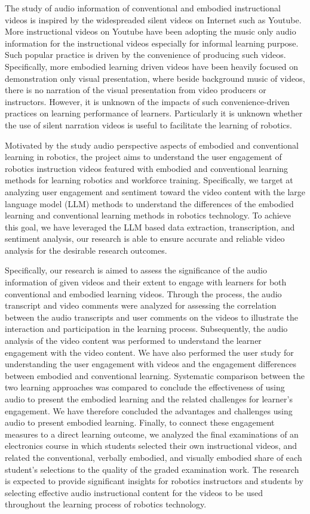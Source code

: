 \documentclass[fleqn,10pt]{JLA_article} %
\begin{document}
The study of audio information of conventional and embodied instructional videos is inspired by the widespreaded silent videos on Internet such as Youtube. More instructional videos on Youtube have been adopting the music only audio information for the instructional videos especially for informal learning purpose. Such popular practice is driven by the convenience of producing such videos. Specifically, more embodied learning driven videos have been heavily focused on demonstration only visual presentation, where beside background music of videos, there is no narration of the visual presentation from video producers or instructors. However, it is unknown of the impacts of such convenience-driven practices on learning performance of learners. Particularly it is unknown whether the use of silent narration videos is useful to facilitate the learning of robotics.

Motivated by the study audio perspective aspects of embodied and conventional learning in robotics, the project aims to understand the user engagement of robotics instruction videos featured with embodied and conventional learning methods for learning robotics and workforce training. Specifically, we target at analyzing user engagement and sentiment toward the video content with the large language model (LLM) methods to understand the differences of the embodied learning and conventional learning methods in robotics technology. To achieve this goal, we have leveraged the LLM based data extraction, transcription, and sentiment analysis, our research is able to ensure accurate and reliable video analysis for the desirable research outcomes.

Specifically, our research is aimed to assess the significance of the audio information of given videos and their extent to engage with learners for both conventional and embodied learning videos. Through the process, the audio transcript and video comments were analyzed for assessing the correlation between the audio transcripts and user comments on the videos to illustrate the interaction and participation in the learning process. Subsequently, the audio analysis of the video content was performed to understand the learner engagement with the video content. We have also performed the user study for understanding the user engagement with videos and the engagement differences between embodied and conventional learning. Systematic comparison between the two learning approaches was compared to conclude the effectiveness of using audio to present the embodied learning and the related challenges for learner's engagement. We have therefore concluded the advantages and challenges using audio to present embodied learning. Finally, to connect these engagement measures to a direct learning outcome, we analyzed the final examinations of an electronics course in which students selected their own instructional videos, and related the conventional, verbally embodied, and visually embodied share of each student's selections to the quality of the graded examination work. The research is expected to provide significant insights for robotics instructors and students by selecting effective audio instructional content for the videos to be used throughout the learning process of robotics technology.
\end{document}
